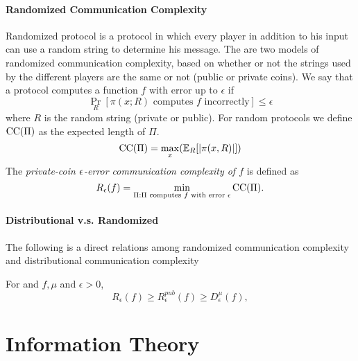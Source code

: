 \paragraph{Randomized Communication Complexity} Randomized protocol is a protocol in which every player in addition to his input can use a random string to determine his message. The are two models of randomized communication complexity, based on whether or not the strings used by the different players are the same or not (public or private coins). \newline
We say that a protocol computes a function $f$ with error up to $\epsilon$ if 
\begin{equation*}
    \Pr_R[\pi(x;R) \text{ computes $f$ incorrectly}] \leq \epsilon 
\end{equation*}
where $R$ is the random string (private or public). \newline
For random protocols we define $\mathrm{CC}(\Pi)$ as the expected length of $\Pi$.
\begin{equation*}
    \mathrm{CC}(\Pi) = \max_x(\mathbb{E}_{R}[|\pi(x, R)|])
\end{equation*}
The \emph{private-coin $\epsilon$-error communication complexity of $f$} is defined as
\begin{equation*}
	R_\epsilon(f) = \min_{\Pi : \text{$\Pi$ computes $f$ with error $\epsilon$}} \mathrm{CC}(\Pi).
\end{equation*}

\paragraph{Distributional v.s. Randomized}
The following is a direct relations among randomized communication complexity and distributional communication complexity
\begin{theorem}
For and $f, \mu$ and $\epsilon > 0$,
\begin{equation*}
	R_{\epsilon}(f)\geq R^{pub}_{\epsilon}(f)\geq D^{\mu}_{\epsilon}(f),
\end{equation*}
\end{theorem}


\section{Information Theory}